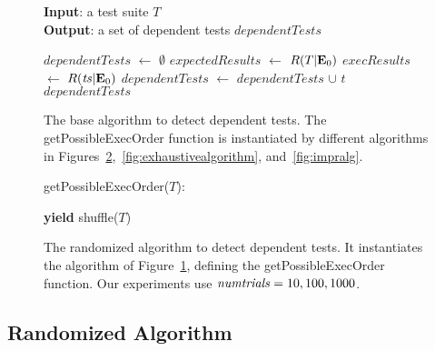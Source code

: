 \begin{figure}[t]
\textbf{Input}: a test suite $\mathit{T}$\\
\textbf{Output}: a set of dependent tests $\mathit{dependentTests}$\\
\vspace{-5mm}
\begin{algorithmic}[1]
\STATE $\mathit{dependentTests}$ $\leftarrow$ $\emptyset$
\STATE $\mathit{expectedResults}$ $\leftarrow$ $R(T|\mathbf{E}_0)$
\STATE $\mathit{execResults}$ $\leftarrow$ $R(\mathit{ts}|\mathbf{E}_0)$
\STATE $\mathit{dependentTests}$ $\leftarrow$ $\mathit{dependentTests}$ $\cup$ $\mathit{t}$
\ENDIF
\ENDFOR
\ENDFOR
\RETURN $\mathit{dependentTests}$
\end{algorithmic}


\vspace{-3mm}
\caption {The base algorithm to detect dependent tests.
The getPossibleExecOrder function is instantiated
by different algorithms in
Figures~\ref{fig:randalgorithm},~\ref{fig:exhaustivealgorithm},
and~\ref{fig:impralg}.
}
\label{fig:basealgorithm}
\end{figure}


\begin{figure}[t]
getPossibleExecOrder($T$):\\
\vspace{-5mm}
\begin{algorithmic}[1]
\STATE \textbf{yield} shuffle($T$)
\ENDFOR
\end{algorithmic}

\vspace{-3mm}
\caption {The randomized algorithm to detect dependent tests.
It instantiates the algorithm of Figure~\ref{fig:basealgorithm}, defining
the getPossibleExecOrder function.
Our experiments use $\mathit{numtrials} = 10,
100, 1000$.}
\label{fig:randalgorithm}
\end{figure}


\subsection{Randomized Algorithm}
\label{sec:randomized}


